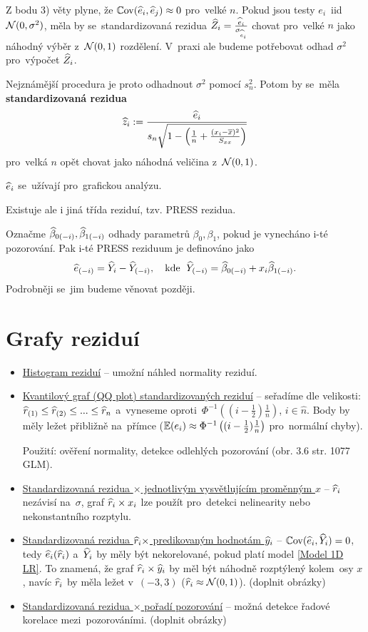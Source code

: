 \begin{remark}
	Z bodu 3) věty plyne, že $\mathbb{C}\mathrm{ov}(\widehat{e}_i, \widehat{e}_j) \approx 0$ pro~velké $n$. Pokud jsou testy $e_i$~iid~$\mathcal{N}(0,\sigma^2)$, měla by se~standardizovaná rezidua $\widehat{Z}_i = \frac{\widehat{e}_i}{\sigma_{\widehat{e}_i}}$ chovat pro~velké $n$ jako náhodný výběr z~$\mathcal{N}(0,1)$ rozdělení. V~praxi ale budeme potřebovat odhad $\sigma^2$ pro~výpočet $\widehat{Z}_i$.
	
	Nejznámější procedura je proto odhadnout $\sigma^2$ pomocí $s_n^2$. Potom by se~měla \textbf{standardizovaná rezidua}
	 $$
		\widehat{z}_i := \frac{\widehat{e}_i}{s_n \sqrt{1 - \left(\frac{1}{n} + \frac{(x_i - \overline{x})^2}{S_{xx}} \right)}}
	 $$
	pro~velká $n$ opět chovat jako náhodná veličina z~$\mathcal{N}(0,1)$.
\end{remark}

\begin{remark}
	 $\widehat{e}_i$ se~užívají pro~grafickou analýzu.
	
	Existuje ale i jiná třída reziduí, tzv. PRESS rezidua.
	
	Označme $\widehat{\beta}_{0(-i)}, \widehat{\beta}_{1(-i)}$ odhady parametrů $\beta_0, \beta_1$, pokud je vynecháno i-té pozorování. Pak i-té PRESS reziduum je definováno jako
	 $$
		\widehat{e}_{(-i)} = \widehat{Y}_i - \widehat{Y}_{(-i)}, \quad \text{kde \;} \widehat{Y}_{(-i)} = \widehat{\beta}_{0(-i)} + x_i \widehat{\beta}_{1(-i)}.
	 $$
	Podrobněji se~jim budeme věnovat později.
\end{remark}

\section{Grafy reziduí}
\begin{itemize}
	\item \underline{Histogram reziduí} -- umožní náhled normality reziduí.
	\item \underline{Kvantilový graf (QQ plot) standardizovaných reziduí} -- seřadíme dle velikosti: $\widehat{r}_{(1)} \leq \widehat{r}_{(2)} \leq... \leq \widehat{r}_n$ a~vyneseme oproti~$\Phi^{-1}\left((i - \frac{1}{2}) \frac{1}{n} \right)$, $i  \in\widehat{n} $. Body by měly ležet přibližně na~přímce ($\mathbb{E} (e_i) \approx \Phi^{-1}\left((i - \frac{1}{2}) \frac{1}{n} \right)$ pro~normální chyby).
	
	Použití: ověření normality, detekce odlehlých pozorování (obr. 3.6 str. 1077 GLM).
	\item \underline{Standardizovaná rezidua $\times$ jednotlivým vysvětlujícím proměnným $x$} -- $\widehat{r}_i$ nezávisí na~$\sigma$, graf $\widehat{r}_i \times x_i$ lze použít pro~detekci nelinearity nebo nekonstantního rozptylu.
	\item \underline{Standardizovaná rezidua $\widehat{r}_i \times$ predikovaným hodnotám $\widehat{y}_i$} -- $\mathbb{C}\mathrm{ov}(\widehat{e}_i, \widehat{Y}_i) = 0$, tedy $\widehat{e}_i(\widehat{r}_i)$ a~$\widehat{Y}_i$ by měly být nekorelované, pokud platí model \eqref{Model 1D LR}. To znamená, že graf $\widehat{r}_i \times \widehat{y}_i$ by měl být náhodně rozptýlený kolem~osy $x$, navíc $\widehat{r}_i$ by měla ležet v~$(-3,3)$ ($ \widehat{r}_i \approx \mathcal{N}(0,1) $).
	(doplnit obrázky)
	\item \underline{Standardizovaná rezidua $\times$ pořadí pozorování} -- možná detekce řadové korelace mezi~pozorováními.
	(doplnit obrázky)
	
\end{itemize}


